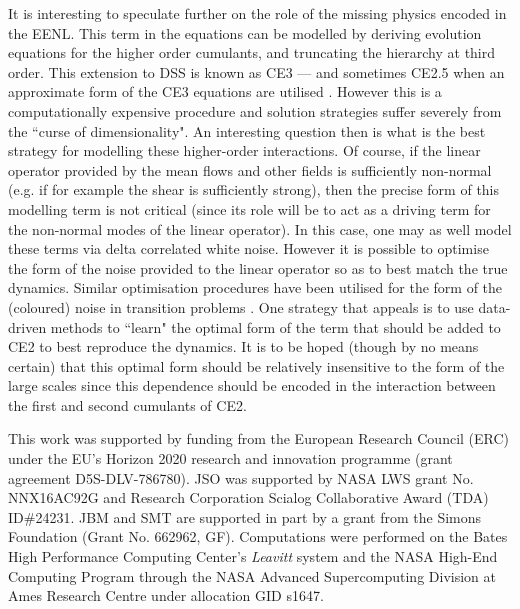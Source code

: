 \documentclass{jfm}
\begin{document}
It is interesting to speculate further on the role of the missing physics encoded in the EENL. This term in the equations can be modelled by deriving evolution equations for the higher order cumulants, and truncating the hierarchy at third order. This extension to DSS is known as CE3 --- and sometimes CE2.5 when an approximate form of the CE3 equations are utilised \citep{marston_qi_tobias_2019}. However this is a computationally expensive procedure and solution strategies suffer severely from the ``curse of dimensionality". An interesting question then is what is the best strategy for modelling these higher-order interactions. Of course, if the linear operator provided by the mean flows and other fields is sufficiently non-normal (e.g. if for example the shear is sufficiently strong), then the precise form of this modelling term is not critical (since its role will be to act as a driving term for the non-normal modes of the linear operator). In this case, one may as well model these terms via delta correlated white noise. However it is possible to optimise the form of the noise provided to the linear operator so as to best match the true dynamics. Similar optimisation procedures have been utilised for the form of the (coloured) noise in transition problems \citep[][]{zjg_2017}. One strategy that appeals is to use data-driven methods to ``learn" the optimal form of the term that should be added to CE2 to best reproduce the dynamics. It is to be hoped (though by no means certain) that this optimal form should be relatively insensitive to the form of the large scales since this dependence should be encoded in the interaction between the first and second cumulants of CE2.   


\bigskip


This work was supported by funding from the European Research Council (ERC) under the EU’s Horizon 2020 research and innovation programme (grant agreement D5S-DLV-786780). 
JSO was supported by NASA LWS grant No. NNX16AC92G and Research Corporation Scialog Collaborative Award (TDA) ID\#24231. JBM and SMT are supported in part by a grant from the Simons Foundation (Grant No. 662962, GF).
Computations were performed on the Bates High Performance Computing Center's \emph{Leavitt} system and the NASA High-End Computing Program through the NASA Advanced Supercomputing Division at Ames Research Centre under allocation GID s1647.



\end{document}
